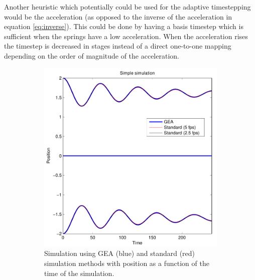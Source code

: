 \documentclass[11pt]{article}
\begin{document}
Another heuristic which potentially could be used for the adaptive timestepping
would be the acceleration (as opposed to the inverse of the acceleration in
equation \ref{eq:inverse}). This could be done by having a basis timestep which
is sufficient when the springs have a low acceleration. When the acceleration
rises the timestep is decreased in stages instead of a direct one-to-one mapping
depending on the order of magnitude of the acceleration.

\begin{figure}
    \begin{subfigure}[t]{0.5\textwidth}
        \includegraphics[width=\textwidth]{../images/inverse_uniform_30fps.pdf}
        \caption{Simulation using GEA (blue) and standard (red) simulation methods with
        position as a function of the time of the simulation.}
        \label{fig:inverse_uniform_30fps_0}
    \end{subfigure}
    \begin{subfigure}[t]{0.5\textwidth}

\end{subfigure}
\end{figure}
\end{document}
